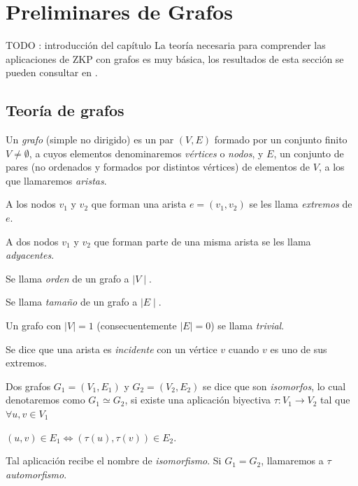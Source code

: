 \chapter{Preliminares de Grafos}\label{ch:preliminaresGrafos}

TODO : introducción del capítulo
La teoría necesaria para comprender las aplicaciones de ZKP con grafos es muy básica, los resultados de esta sección se pueden consultar en \citep{grafosyOD}.

\hfil

\section{Teoría de grafos}

\begin{definition}
	Un \textit{grafo} (simple no dirigido) es un par $(V,E)$ formado por un conjunto finito $V \neq \emptyset$, a cuyos elementos denominaremos \textit{vértices} o \textit{nodos}, y $E$, un conjunto de pares (no ordenados y formados por distintos vértices) de elementos de $V$, a los que llamaremos \textit{aristas}.
	
	A los nodos $v_1$ y $v_2$ que forman una arista $e = (v_1, v_2)$ se les llama \textit{extremos} de $e$.
\end{definition}


\begin{definition}[Conceptos]
	\hfil
	
	A dos nodos $v_1$ y $v_2$ que forman parte de una misma arista se les llama \textit{adyacentes}.
	
	Se llama \textit{orden} de un grafo a $\mid V \mid $.
	
	Se llama \textit{tamaño} de un grafo a $\mid E \mid $.
	
	Un grafo con $ \mid V \mid = 1$ (consecuentemente $\mid E \mid = 0$) se llama \textit{trivial}.
	
	Se dice que una arista es \textit{incidente} con un vértice $v$ cuando $v$ es uno de sus extremos.
\end{definition}



\begin{definition}
	Dos grafos $G_1 = (V_1, E_1)$ y $G_2 = (V_2, E_2)$ se dice que son \textit{isomorfos}, lo cual denotaremos como $G_1 \simeq G_2$, si existe una aplicación biyectiva $\tau : V_1 \rightarrow V_2$ tal que $\forall u,v \in V_1$
	
	\begin{center}
		$(u,v) \in E_1 \Leftrightarrow (\tau(u), \tau(v)) \in E_2 $.
	\end{center}
	
	Tal aplicación recibe el nombre de \textit{isomorfismo}. Si $G_1 = G_2$, llamaremos a $\tau$ \textit{automorfismo}.
\end{definition}

